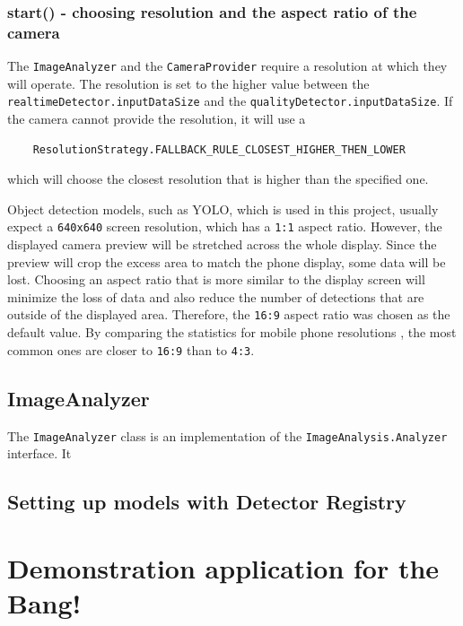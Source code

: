 \subsection{start() - choosing resolution and the aspect ratio of the camera}

The \texttt{ImageAnalyzer} and the \texttt{CameraProvider} require a resolution at which they will operate. The resolution is set to the higher value between the \texttt{realtimeDetector.inputDataSize} and the \texttt{qualityDetector.inputDataSize}. If the camera cannot provide the resolution, it will use a
\begin{lstlisting}
    ResolutionStrategy.FALLBACK_RULE_CLOSEST_HIGHER_THEN_LOWER
\end{lstlisting}
which will choose the closest resolution that is higher than the specified one. 

Object detection models, such as YOLO, which is used in this project, usually expect a \texttt{640x640} screen resolution, which has a \texttt{1:1} aspect ratio. However, the displayed camera preview will be stretched across the whole display. Since the preview will crop the excess area to match the phone display, some data will be lost. Choosing an aspect ratio that is more similar to the display screen will minimize the loss of data and also reduce the number of detections that are outside of the displayed area. Therefore, the \texttt{16:9} aspect ratio was chosen as the default value. By comparing the statistics for mobile phone resolutions \cite{aspectRatioStats}, the most common ones are closer to \texttt{16:9} than to \texttt{4:3}.

\section{ImageAnalyzer}
\label{ImageAnalyzer}

The \texttt{ImageAnalyzer} class is an implementation of the \texttt{ImageAnalysis.Analyzer} interface. It 

\section{Setting up models with Detector Registry}
\label{DetectorRegistry}

\chapter{Demonstration application for the Bang!}
\label{bangApp}

